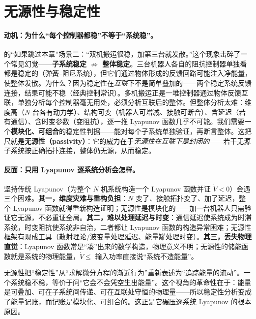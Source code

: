 \section{无源性与稳定性}
\label{sec:cm-passivity}

\paragraph{动机：为什么“每个控制器都稳”不等于“系统稳”。}
 的“如果跳过本章”场景二：“双机搬运很稳，加第三台就发散。”这个现象击碎了一个常见幻觉——\textbf{子系统稳定 $\not\Rightarrow$ 整体稳定}。三台机器人各自的阻抗控制器单独看都是稳定的（弹簧–阻尼系统），但它们通过物体形成的反馈回路可能注入净能量，使整体发散。为什么？因为稳定性在\emph{互联}下不是简单叠加的——两个稳定系统反馈连接，结果可能不稳（经典控制常识）。多机搬运正是一堆控制器通过物体反馈互联，单独分析每个控制器毫无用处，必须分析互联后的整体。但整体分析太难：维度高（$N$ 台各有动力学）、结构可变（机器人可增减、接触可断合）、含延迟（若有通信）、含时变参数（变阻抗），逐一推 Lyapunov 函数几乎不可能。我们需要一个\textbf{模块化、可组合}的稳定性判据——能对每个子系统单独验证，再断言整体。这把尺就是\textbf{无源性（passivity）}：它的威力在于\emph{无源性在互联下是封闭的}——若干无源子系统按正确拓扑连接，整体仍无源，从而稳定。

\paragraph{反面：只用 Lyapunov 逐系统分析会怎样。}
坚持传统 Lyapunov（为整个 $N$ 机系统构造一个 Lyapunov 函数并证 $\dot V<0$）会遇三个困难。\textbf{其一，维度灾难与重构负担}：$N$ 变了、接触拓扑变了、加了延迟，整个 Lyapunov 函数就得重新构造证明；无源性是模块化的——加一台机器人只需验证它无源，不必重证全局。\textbf{其二，难以处理延迟与时变}：通信延迟使系统成为时滞系统，时变阻抗使系统非自治，二者都让 Lyapunov 函数的构造异常困难；无源性框架有现成工具（散射理论/波变量处理延迟、能量罐处理时变）。\textbf{其三，丢失物理直觉}：Lyapunov 函数常是“凑”出来的数学构造，物理意义不明；无源性的储能函数就是系统的物理能量，$\dot V\le$ 输入功率直接说“系统不造能量”。

\begin{insight}
无源性把“稳定性”从“求解微分方程的渐近行为”重新表述为“追踪能量的流动”。一个系统稳不稳，等价于问“它会不会凭空生出能量”。这个视角的革命性在于：能量是可叠加、可在子系统间传递、可在互联处守恒的物理量——所以稳定性分析变成了能量记账，而记账是模块化、可组合的。这正是它碾压逐系统 Lyapunov 的根本原因。
\end{insight}

